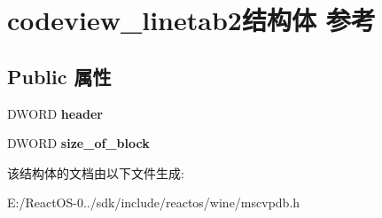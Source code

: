 \hypertarget{structcodeview__linetab2}{}\section{codeview\+\_\+linetab2结构体 参考}
\label{structcodeview__linetab2}
\subsection*{Public 属性}
\begin{DoxyCompactItemize}
\item 
\mbox{\label{structcodeview__linetab2_af3a4e866ed50495ed57fe7152426959c}} 
D\+W\+O\+RD {\bfseries header}
\item 
\mbox{\label{structcodeview__linetab2_a0aafbdca35dd304376444cf2b81d11d1}} 
D\+W\+O\+RD {\bfseries size\+\_\+of\+\_\+block}
\end{DoxyCompactItemize}


该结构体的文档由以下文件生成\+:\begin{DoxyCompactItemize}
\item 
E\+:/\+React\+O\+S-\/0../sdk/include/reactos/wine/mscvpdb.\+h\end{DoxyCompactItemize}
